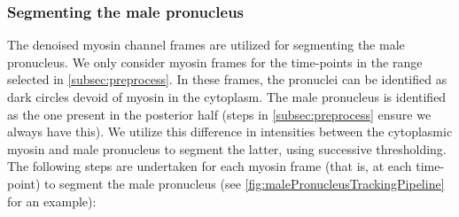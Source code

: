 \subsubsection{Segmenting the male pronucleus}\label{subsubsec:nucleusDetect}
The denoised myosin channel frames are utilized for segmenting the male pronucleus. We only consider myosin frames for the time-points in the range selected in \autoref{subsec:preprocess}. In these frames, the pronuclei can be identified as dark circles devoid of myosin in the cytoplasm. The male pronucleus is identified as the one present in the posterior half (steps in \autoref{subsec:preprocess} ensure we always have this). We utilize this difference in intensities between the cytoplasmic myosin and male pronucleus to segment the latter, using successive thresholding. The following steps are undertaken for each myosin frame (that is, at each time-point) to segment the male pronucleus (see \autoref{fig:malePronucleusTrackingPipeline} for an example):
